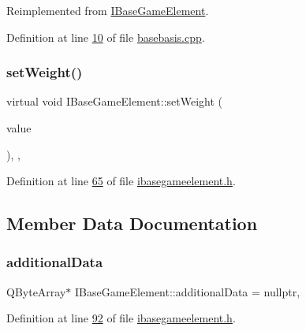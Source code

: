 Reimplemented from \hyperlink{a00137_a324cba2176155a50b5a2239eb0a8b6a0}{I\+Base\+Game\+Element}.



Definition at line \hyperlink{a00026_source_l00010}{10} of file \hyperlink{a00026_source}{basebasis.\+cpp}.

\mbox{\label{a00137_a4b5e42aa7985c9bf959f0275cbc1bac7}} 
\subsubsection{\texorpdfstring{set\+Weight()}{setWeight()}}
{\footnotesize\ttfamily virtual void I\+Base\+Game\+Element\+::set\+Weight (\begin{DoxyParamCaption}\item[{\hyperlink{a00161}{Infinity\+Double} $\ast$}]{value }\end{DoxyParamCaption})\hspace{0.3cm}{\ttfamily [inline]}, {\ttfamily [virtual]}, {\ttfamily [inherited]}}



Definition at line \hyperlink{a00047_source_l00065}{65} of file \hyperlink{a00047_source}{ibasegameelement.\+h}.



\subsection{Member Data Documentation}
\mbox{\label{a00137_a4d3547697d3bd0c2d65c83b07b3f8f91}} 
\subsubsection{\texorpdfstring{additional\+Data}{additionalData}}
{\footnotesize\ttfamily Q\+Byte\+Array$\ast$ I\+Base\+Game\+Element\+::additional\+Data = nullptr\hspace{0.3cm}{\ttfamily [protected]}, {\ttfamily [inherited]}}



Definition at line \hyperlink{a00047_source_l00092}{92} of file \hyperlink{a00047_source}{ibasegameelement.\+h}.

